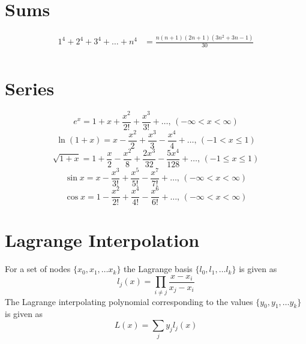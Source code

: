 

\section{Sums}
\begin{align*}
	1^4 + 2^4 + 3^4 + \dots + n^4 &= \frac{n(n+1)(2n+1)(3n^2 + 3n - 1)}{30} \\
\end{align*}

\section{Series}
$$e^x = 1+x+\frac{x^2}{2!}+\frac{x^3}{3!}+\dots,\,(-\infty<x<\infty)$$
$$\ln(1+x) = x-\frac{x^2}{2}+\frac{x^3}{3}-\frac{x^4}{4}+\dots,\,(-1<x\leq1)$$
$$\sqrt{1+x} = 1+\frac{x}{2}-\frac{x^2}{8}+\frac{2x^3}{32}-\frac{5x^4}{128}+\dots,\,(-1\leq x\leq1)$$
$$\sin x = x-\frac{x^3}{3!}+\frac{x^5}{5!}-\frac{x^7}{7!}+\dots,\,(-\infty<x<\infty)$$
$$\cos x = 1-\frac{x^2}{2!}+\frac{x^4}{4!}-\frac{x^6}{6!}+\dots,\,(-\infty<x<\infty)$$

\section{Lagrange Interpolation}
For a set of nodes $\{x_0, x_1, \dots x_k\}$ the Lagrange basis $\{l_0, l_1, \dots l_k\}$ is given as
$$l_j(x) = \prod_{i \neq j} \dfrac{x-x_i}{x_j-x_i}$$
The Lagrange interpolating polynomial corresponding to the values $\{y_0, y_1, \dots y_k\}$ is given as
$$L(x)=\sum_{j} y_j l_j(x)$$


